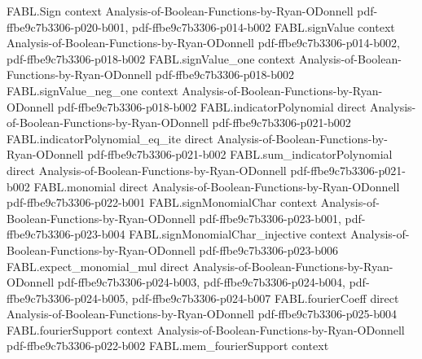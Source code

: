 \begin{theorem}
\label{FABL.three_mul_variance_mul_rpow_le_totalStableInfluence_one_third}
\leanok
{}
\proofstep
  {FABL.Sign}
  {context}
  {Analysis-of-Boolean-Functions-by-Ryan-ODonnell}
  {pdf-ffbe9c7b3306-p020-b001,
    pdf-ffbe9c7b3306-p014-b002}
\proofstep
  {FABL.signValue}
  {context}
  {Analysis-of-Boolean-Functions-by-Ryan-ODonnell}
  {pdf-ffbe9c7b3306-p014-b002,
    pdf-ffbe9c7b3306-p018-b002}
\proofstep
  {FABL.signValue_one}
  {context}
  {Analysis-of-Boolean-Functions-by-Ryan-ODonnell}
  {pdf-ffbe9c7b3306-p018-b002}
\proofstep
  {FABL.signValue_neg_one}
  {context}
  {Analysis-of-Boolean-Functions-by-Ryan-ODonnell}
  {pdf-ffbe9c7b3306-p018-b002}
\proofstep
  {FABL.indicatorPolynomial}
  {direct}
  {Analysis-of-Boolean-Functions-by-Ryan-ODonnell}
  {pdf-ffbe9c7b3306-p021-b002}
\proofstep
  {FABL.indicatorPolynomial_eq_ite}
  {direct}
  {Analysis-of-Boolean-Functions-by-Ryan-ODonnell}
  {pdf-ffbe9c7b3306-p021-b002}
\proofstep
  {FABL.sum_indicatorPolynomial}
  {direct}
  {Analysis-of-Boolean-Functions-by-Ryan-ODonnell}
  {pdf-ffbe9c7b3306-p021-b002}
\proofstep
  {FABL.monomial}
  {direct}
  {Analysis-of-Boolean-Functions-by-Ryan-ODonnell}
  {pdf-ffbe9c7b3306-p022-b001}
\proofstep
  {FABL.signMonomialChar}
  {context}
  {Analysis-of-Boolean-Functions-by-Ryan-ODonnell}
  {pdf-ffbe9c7b3306-p023-b001,
    pdf-ffbe9c7b3306-p023-b004}
\proofstep
  {FABL.signMonomialChar_injective}
  {context}
  {Analysis-of-Boolean-Functions-by-Ryan-ODonnell}
  {pdf-ffbe9c7b3306-p023-b006}
\proofstep
  {FABL.expect_monomial_mul}
  {direct}
  {Analysis-of-Boolean-Functions-by-Ryan-ODonnell}
  {pdf-ffbe9c7b3306-p024-b003,
    pdf-ffbe9c7b3306-p024-b004,
    pdf-ffbe9c7b3306-p024-b005,
    pdf-ffbe9c7b3306-p024-b007}
\proofstep
  {FABL.fourierCoeff}
  {direct}
  {Analysis-of-Boolean-Functions-by-Ryan-ODonnell}
  {pdf-ffbe9c7b3306-p025-b004}
\proofstep
  {FABL.fourierSupport}
  {context}
  {Analysis-of-Boolean-Functions-by-Ryan-ODonnell}
  {pdf-ffbe9c7b3306-p022-b002}
\proofstep
  {FABL.mem_fourierSupport}
  {context}

\end{theorem}
